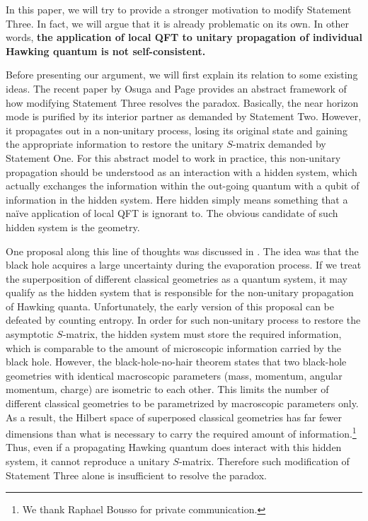 \documentclass[aps,showpacs,onecolumn,floats,prd,superscriptaddress,nofootinbib]{revtex4-1}
\begin{document}
In this paper, we will try to provide a stronger motivation to modify Statement Three. 
In fact, we will argue that it is already problematic on its own. 
In other words, {\bf the application of local QFT to unitary propagation of individual Hawking quantum is not self-consistent. } 

Before presenting our argument, we will first explain its relation to some existing ideas.
The recent paper by Osuga and Page \cite{OsuPag16} provides an abstract framework of how modifying Statement Three resolves the paradox.
Basically, the near horizon mode is purified by its interior partner as demanded by Statement Two.
However, it propagates out in a non-unitary process, losing its original state and gaining the appropriate information to restore the unitary $S$-matrix demanded by Statement One. 
For this abstract model to work in practice, this non-unitary propagation should be understood as an interaction with a hidden system, which actually exchanges the information within the out-going quantum with a qubit of information in the hidden system.
Here hidden simply means something that a na\"ive application of local QFT is ignorant to.
The obvious candidate of such hidden system is the geometry.

One proposal along this line of thoughts was discussed in \cite{NomVar12}. 
The idea was that the black hole acquires a large uncertainty during the evaporation process. 
If we treat the superposition of different classical geometries as a quantum system, it may qualify as the hidden system that is responsible for the non-unitary propagation of Hawking quanta. 
Unfortunately, the early version of this proposal can be defeated by counting entropy.
In order for such non-unitary process to restore the asymptotic $S$-matrix, the hidden system must store the required information, which is comparable to the amount of microscopic information carried by the black hole.
However, the black-hole-no-hair theorem states that two black-hole geometries with identical macroscopic parameters (mass, momentum, angular momentum, charge) are isometric to each other. 
This limits the number of different classical geometries to be parametrized by macroscopic parameters only.
As a result, the Hilbert space of superposed classical geometries has far fewer dimensions than what is necessary to carry the required amount of information.\footnote{We thank Raphael Bousso for private communication.}
Thus, even if a propagating Hawking quantum does interact with this hidden system, it cannot reproduce a unitary $S$-matrix.
Therefore such modification of Statement Three alone is insufficient to resolve the paradox.
\end{document}
